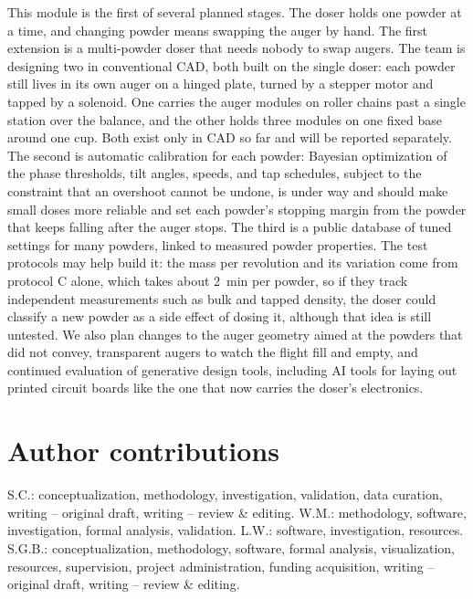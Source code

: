 \documentclass[twoside,twocolumn,9pt]{article}
\begin{document}
\label{sec:future}
This module is the first of several planned stages. The doser holds one powder at a time, and changing powder means swapping the auger by hand. The first extension is a multi-powder doser that needs nobody to swap augers. The team is designing two in conventional CAD, both built on the single doser: each powder still lives in its own auger on a hinged plate, turned by a stepper motor and tapped by a solenoid. One carries the auger modules on roller chains past a single station over the balance, and the other holds three modules on one fixed base around one cup. Both exist only in CAD so far and will be reported separately. The second is automatic calibration for each powder: Bayesian optimization of the phase thresholds, tilt angles, speeds, and tap schedules, subject to the constraint that an overshoot cannot be undone, is under way and should make small doses more reliable and set each powder's stopping margin from the powder that keeps falling after the auger stops. The third is a public database of tuned settings for many powders, linked to measured powder properties. The test protocols may help build it: the mass per revolution and its variation come from protocol C alone, which takes about 2~min per powder, so if they track independent measurements such as bulk and tapped density, the doser could classify a new powder as a side effect of dosing it, although that idea is still untested. We also plan changes to the auger geometry aimed at the powders that did not convey, transparent augers to watch the flight fill and empty, and continued evaluation of generative design tools, including AI tools for laying out printed circuit boards like the one that now carries the doser's electronics.

\section*{Author contributions}
S.C.: conceptualization, methodology, investigation, validation, data curation, writing -- original draft, writing -- review \& editing. W.M.: methodology, software, investigation, formal analysis, validation. L.W.: software, investigation, resources. S.G.B.: conceptualization, methodology, software, formal analysis, visualization, resources, supervision, project administration, funding acquisition, writing -- original draft, writing -- review \& editing.
\end{document}
